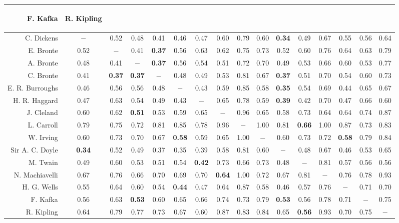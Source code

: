 \documentclass[conference]{IEEEtran}
\begin{document}
\begin{table}[htb]
\begin{center}
\begin{tabular}{r|ccccccccccccccc}
\begin{sideways}
F. Kafka
\end{sideways} & \begin{sideways}
R. Kipling
\end{sideways}\tabularnewline
\hline 
C. Dickens & $-$ & 0.52 & 0.48 & 0.41 & 0.46 & 0.47 & 0.60 & 0.79 & 0.60 & \textbf{0.34} & 0.49 & 0.67 & 0.55 & 0.56 & 0.64 \\
E. Bronte & 0.52 & $-$ & 0.41 & \textbf{0.37} & 0.56 & 0.63 & 0.62 & 0.75 & 0.73 & 0.52 & 0.60 & 0.76 & 0.64 & 0.63 & 0.79 \\
A. Bronte & 0.48 & 0.41 & $-$ & \textbf{0.37} & 0.56 & 0.54 & 0.51 & 0.72 & 0.70 & 0.49 & 0.53 & 0.66 & 0.60 & 0.53 & 0.77 \\
C. Bronte & 0.41 & \textbf{0.37} & \textbf{0.37} & $-$ & 0.48 & 0.49 & 0.53 & 0.81 & 0.67 & \textbf{0.37} & 0.51 & 0.70 & 0.54 & 0.60 & 0.73 \\
E. R. Burroughs & 0.46 & 0.56 & 0.56 & 0.48 & $-$ & 0.43 & 0.59 & 0.85 & 0.58 & \textbf{0.35} & 0.54 & 0.69 & 0.44 & 0.65 & 0.67 \\
H. R. Haggard & 0.47 & 0.63 & 0.54 & 0.49 & 0.43 & $-$ & 0.65 & 0.78 & 0.59 & \textbf{0.39} & 0.42 & 0.70 & 0.47 & 0.66 & 0.60 \\
J. Cleland & 0.60 & 0.62 & \textbf{0.51} & 0.53 & 0.59 & 0.65 & $-$ & 0.96 & 0.65 & 0.58 & 0.73 & 0.64 & 0.64 & 0.74 & 0.87 \\
L. Carroll & 0.79 & 0.75 & 0.72 & 0.81 & 0.85 & 0.78 & 0.96 & $-$ & 1.00 & 0.81 & \textbf{0.66} & 1.00 & 0.87 & 0.73 & 0.83 \\
W. Irving & 0.60 & 0.73 & 0.70 & 0.67 & \textbf{0.58} & 0.59 & 0.65 & 1.00 & $-$ & 0.60 & 0.73 & 0.72 & \textbf{0.58} & 0.79 & 0.84 \\
Sir A. C. Doyle & \textbf{0.34} & 0.52 & 0.49 & 0.37 & 0.35 & 0.39 & 0.58 & 0.81 & 0.60 & $-$ & 0.48 & 0.67 & 0.46 & 0.53 & 0.65 \\
M. Twain & 0.49 & 0.60 & 0.53 & 0.51 & 0.54 & \textbf{0.42} & 0.73 & 0.66 & 0.73 & 0.48 & $-$ & 0.81 & 0.57 & 0.56 & 0.56 \\
N. Machiavelli & 0.67 & 0.76 & 0.66 & 0.70 & 0.69 & 0.70 & \textbf{0.64} & 1.00 & 0.72 & 0.67 & 0.81 & $-$ & 0.76 & 0.78 & 0.93 \\
H. G. Wells & 0.55 & 0.64 & 0.60 & 0.54 & \textbf{0.44} & 0.47 & 0.64 & 0.87 & 0.58 & 0.46 & 0.57 & 0.76 & $-$ & 0.71 & 0.70 \\
F. Kafka & 0.56 & 0.63 & \textbf{0.53} & 0.60 & 0.65 & 0.66 & 0.74 & 0.73 & 0.79 & \textbf{0.53} & 0.56 & 0.78 & 0.71 & $-$ & 0.75 \\
R. Kipling & 0.64 & 0.79 & 0.77 & 0.73 & 0.67 & 0.60 & 0.87 & 0.83 & 0.84 & 0.65 & \textbf{0.56} & 0.93 & 0.70 & 0.75 & $-$ \\
\end{tabular}
\end{center}
\end{table} 
\end{document}
